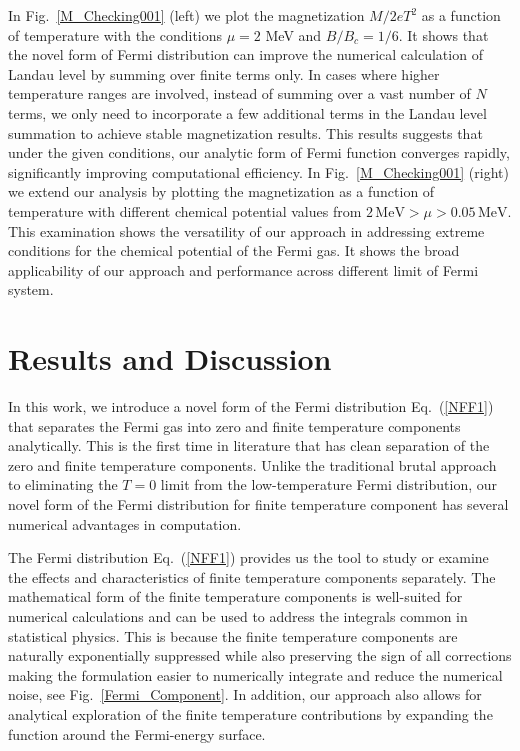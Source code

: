 \documentclass[sn-mathphys,Numbered]{sn-jnl}
\begin{document}
In Fig.~\ref{M_Checking001} (left) we plot the magnetization $M/2eT^2$ as a function of temperature with the conditions $\mu=2$ MeV and $B/B_c=1/6$. It shows that the novel form of Fermi distribution can improve the numerical calculation of Landau level by summing over finite terms only. In cases where higher temperature ranges are involved, instead of summing over a vast number of $N$ terms, we only need to incorporate a few additional terms in the Landau level summation to achieve stable magnetization results. This results suggests that under the given conditions, our analytic form of Fermi function converges rapidly, significantly improving computational efficiency. In Fig.~\ref{M_Checking001} (right) we extend our analysis by plotting the magnetization as a function of temperature with different chemical potential values from $2\,\mathrm{MeV}>\mu>0.05\,\mathrm{MeV}$. This examination shows the versatility of our approach in addressing extreme conditions for the chemical potential of the Fermi gas. It shows the broad applicability of our approach and performance across different limit of Fermi system.








\section{Results and Discussion}
\label{sec12}
In this work, we introduce a novel form of the Fermi distribution Eq.~(\ref{NFF1}) that separates the Fermi gas into zero and finite temperature components analytically. This is the first time in literature that has clean separation of the zero and finite temperature components. Unlike the traditional brutal approach to eliminating the $T=0$ limit from the low-temperature Fermi distribution, our novel form of the Fermi distribution for finite temperature component has several numerical advantages in computation. 

The Fermi distribution Eq.~(\ref{NFF1}) provides us the tool to study or examine the effects and characteristics of finite temperature components separately. The mathematical form of the finite temperature components is well-suited for numerical calculations and can be used to address the integrals common in statistical physics. This is because the finite temperature components are naturally exponentially suppressed while also preserving the sign of all corrections making the formulation easier to numerically integrate and reduce the numerical noise, see Fig.~\ref{Fermi_Component}. In addition, our approach also allows for analytical exploration of the finite temperature contributions by expanding the function around the Fermi-energy surface.
\end{document}
